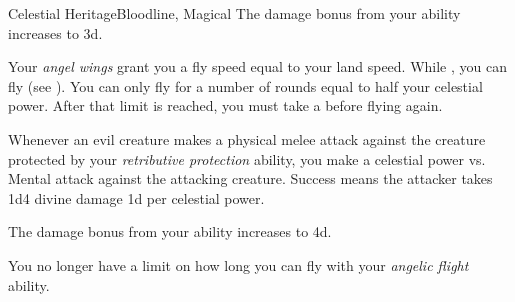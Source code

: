 \begin{feat}{Celestial Heritage}{Bloodline, Magical}
         The damage bonus from your  ability increases to \plus3d.

         Your \textit{angel wings} grant you a fly speed equal to your land speed.
        While \unencumbered, you can fly (see ).
        You can only fly for a number of rounds equal to half your celestial power.
        After that limit is reached, you must take a  before flying again.

         Whenever an evil creature makes a physical melee attack against the creature protected by your \textit{retributive protection} ability, you make a celestial power vs. Mental attack against the attacking creature.
        Success means the attacker takes 1d4 divine damage \plus1d per celestial power.

         The damage bonus from your  ability increases to \plus4d.

        \ff[17]{} %

         You no longer have a limit on how long you can fly with your \textit{angelic flight} ability.
    \end{feat}

